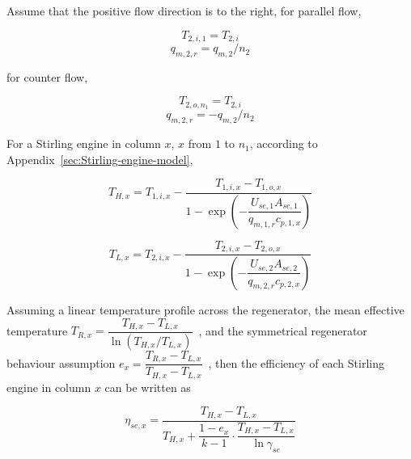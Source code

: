 \documentclass{article}
\begin{document}
Assume that the positive flow direction is to the right, for parallel flow,

\begin{equation*}
	T_{2,i,1}=T_{2,i}\label{eq:T_2_i_1}
\end{equation*}
\begin{equation*}
	q_{m,2,r}=q_{m,2}/n_{2}
\end{equation*}

for counter flow,

\begin{equation*}
	T_{2,o,n_1}=T_{2,i}\label{eq:T_2_o_n1}
\end{equation*}
\begin{equation*}
	q_{m,2,r}=-q_{m,2}/n_{2}
\end{equation*}

For a Stirling engine in column $x$, $x$ from $1$ to $n_1$, according to Appendix~\ref{sec:Stirling-engine-model},

\begin{equation*}
	T_{H,x}=T_{1,i,x}-\dfrac{T_{1,i,x}-T_{1,o,x}}{1-\exp(-\dfrac{U_{se,1}A_{se,1}}{q_{m,1,r}c_{p,1,x}})}\label{eq:T_H_x}
\end{equation*}


\begin{equation*}
	T_{L,x}=T_{2,i,x}-\dfrac{T_{2,i,x}-T_{2,o,x}}{1-\exp(-\dfrac{U_{se,2}A_{se,2}}{q_{m,2,r}c_{p,2,x}})}\label{eq:T_L_x}
\end{equation*}

Assuming a linear temperature profile across the regenerator, the mean effective temperature $T_{R,x}=\dfrac{T_{H,x}-T_{L,x}}{\ln(T_{H,x}/T_{L,x})}$~\cite{Der2007,Cavazzuti2012}, and the symmetrical regenerator behaviour assumption $e_{x}=\dfrac{T_{R,x}-T_{L,x}}{T_{H,x}-T_{L,x}}$~\cite{Formosa2010,Juhasz2010}, then the efficiency of each Stirling engine in column $x$ can be written as~\cite{Stine1985,Goswami2015}

\begin{equation*}
	\eta_{se,x}=\dfrac{T_{H,x}-T_{L,x}}{T_{H,x}+\dfrac{1-e_{x}}{k-1}\cdot\dfrac{T_{H,x}-T_{L,x}}{\ln\gamma_{se}}}\label{eq:eta_striling_x}
\end{equation*}
\end{document}
